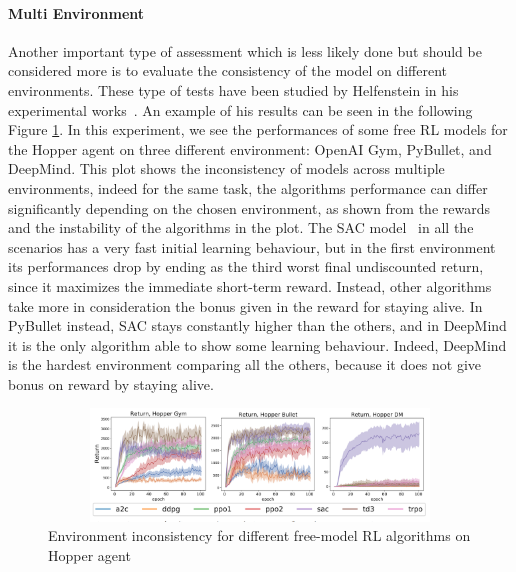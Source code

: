\documentclass{article}
\begin{document}
\paragraph{Multi Environment}
Another important type of assessment which is less likely done but should be considered more is to evaluate the consistency of the model on different environments. These type of tests have been studied by Helfenstein in his experimental works~\cite{BenchmarkingDRL}. An example of his results can be seen in the following Figure \ref{fig:env}. In this experiment, we see the performances of some free RL models for the Hopper agent on three different environment: OpenAI Gym, PyBullet, and DeepMind. This plot shows the inconsistency of  models across multiple environments, indeed for the same task, the algorithms performance can differ significantly depending on the chosen environment, as shown from the rewards and the instability of the algorithms in the plot.
The SAC model~\cite{SAC} in all the scenarios has a very fast initial learning behaviour, but in the first environment its performances drop by ending as the third worst final undiscounted return, since it maximizes the immediate short-term reward. Instead, other algorithms take more in consideration the bonus given in the reward for staying alive. In PyBullet instead, SAC stays constantly higher than the others, and in DeepMind it is the only algorithm able to show some learning behaviour. Indeed, DeepMind is the hardest environment comparing all the others, because it does not give bonus on reward by staying alive.
\begin{figure}[!tp]
	\centering
	\includegraphics[width=15cm,height=3cm]{./images/Environements_plot.png}
	\caption{Environment inconsistency for different free-model RL algorithms on Hopper agent \cite{BenchmarkingDRL}}
	\label{fig:env}
	\footnotesize{}
\end{figure}
\end{document}
